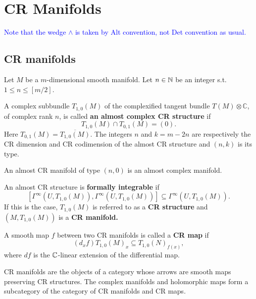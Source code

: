 \chapter{CR Manifolds}
\textcolor{blue}{Note that the wedge $\wedge $  is taken by Alt convention, not Det convention as usual.}

\section{CR manifolds}
Let $M$ be a $m$-dimensional smooth manifold.  Let $n\in {\mathbb N}$ be an integer s.t. $1\leq n \leq [m/2]$.  
\begin{definition}
    A complex subbundle $T_{1,0}(M)$ of the complexified tangent bundle $T(M) \otimes \mathbb{C}$, of complex rank $n$, is called \textbf{an almost complex CR structure} if 
    $$
T_{1,0}(M) \cap T_{0,1}(M)=(0).
$$ 
Here $ T_{0,1}(M)=\overline{T_{1,0}(M)}$. The integers $n$ and $k=m-2n$ are respectively the CR dimension and CR codimension of the almost CR structure and $(n,k)$ is its type.    
\end{definition}
\begin{remark}
An almost CR manifold of type $(n,0) $ is an almost complex manifold.  
\end{remark}
\begin{definition}
    An almost CR structure is \textbf{formally integrable} if
    $$
\left[\Gamma^{\infty}\left(U, T_{1,0}(M)\right), \Gamma^{\infty}\left(U, T_{1,0}(M)\right)\right] \subseteq \Gamma^{\infty}\left(U, T_{1,0}(M)\right).
$$
If this is the case, $T_{1,0}(M)$ is referred to as a\textbf{ CR structure} and $(M,T_{1,0}(M))$ is a \textbf{CR manifold. } 
\end{definition}
\begin{definition}
    A smooth map $f$ between two CR manifolds is called a \textbf{CR map} if   
    $$
\left(d_{x} f\right) T_{1,0}(M)_{x} \subseteq T_{1,0}(N)_{f(x)},
$$
where $df$ is the ${\mathbb C}$-linear extension of the differential map.  
\end{definition}
\begin{remark}
    CR manifolds are the objects of a category whose arrows are smooth maps preserving CR structures. The  complex manifolds and holomorphic maps form a subcategory of the category of CR manifolds and CR maps.
\end{remark}

